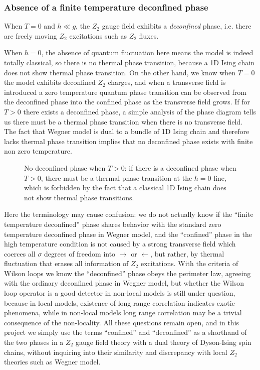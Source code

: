 \documentclass[hyperref, a4paper]{article}
\newcommand*{\Ztwo}{\texorpdfstring{$\mathbb{Z}_2$ }{Z2 }}
\def\mathbb#1{#1}%
\begin{document}
\subsubsection{Absence of a finite temperature deconfined phase}\label{sec:absence-of-z2-deconfined-phase}

When $T=0$ and $h \ll g$, the \Ztwo gauge field exhibits a \emph{deconfined} phase, i.e. there are freely moving \Ztwo excitations such as \Ztwo fluxes.

When $h = 0$, the absence of quantum fluctuation here means the model is indeed totally classical, so there is no thermal phase transition, because a 1D Ising chain does not show thermal phase transition.
On the other hand, we know when $T=0$ the model exhibits deconfined \Ztwo charges, and when a transverse field is introduced a zero temperature quantum phase transition can be observed from the deconfined phase into the confined phase as the transverse field grows.
If for $T > 0$ there exists a deconfined phase, a simple analysis of the phase diagram tells us there must be a thermal phase transition when there is no transverse field.
The fact that Wegner model is dual to a bundle of 1D Ising chain and therefore lacks thermal phase transition implies that no deconfined phase exists with finite non zero temperature.

\begin{figure}
    \centering
    
    \caption{No deconfined phase when $T > 0$: if there is a deconfined phase when $T > 0$, there must be a thermal phase transition at the $h=0$ line, which is forbidden by the fact that a classical 1D Ising chain does not show thermal phase transitions.}
    \label{fig:phase-diagram-expected-pure-z2}
\end{figure}

Here the terminology may cause confusion: we do not actually know if the ``finite temperature deconfined'' phase shares behavior with the standard zero temperature deconfined phase in Wegner model, and the ``confined'' phase in the high temperature condition is not caused by a strong transverse field which coerces all $\sigma$ degrees of freedom into $\rightarrow$ or $\leftarrow$, but rather, by thermal fluctuation that erases all information of \Ztwo excitations.
With the criteria of Wilson loops we know the ``deconfined'' phase obeys the perimeter law, agreeing with the ordinary deconfined phase in Wegner model, but whether the Wilson loop operator is a good detector in non-local models is still under question, because in local models, existence of long range correlation indicates exotic phenomena, while in non-local models long range correlation may be a trivial consequence of the non-locality.
All these questions remain open, and in this project we simply use the terms ``confined'' and ``deconfined'' as a shorthand of the two phases in a \Ztwo gauge field theory with a dual theory of Dyson-Ising spin chains, without inquiring into their similarity and discrepancy with local \Ztwo theories such as Wegner model.
\end{document}
